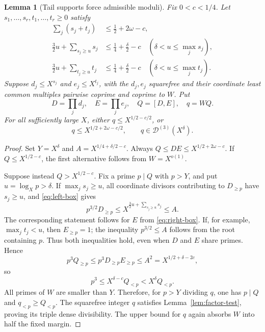 \documentclass[11pt,a4paper]{article}
\newtheorem{lemma}[theorem]{Lemma}
\theoremstyle{definition}\newtheorem{definition}[theorem]{Definition}
\theoremstyle{remark}\newtheorem{remark}[theorem]{Remark}
\numberwithin{equation}{section}
\begin{document}
\begin{lemma}[Tail supports force admissible moduli]\label{lem:lcm}
Fix $0<c<1/4$. Let $s_1,\ldots,s_r,t_1,\ldots,t_r\ge0$ satisfy
\begin{align}
 \sum_j(s_j+t_j)&\le\tfrac12+2\omega-c,\label{eq:total-box}\\
 \tfrac32u+\sum_{s_j\ge u}s_j&\le\tfrac14+\tfrac\delta2-c
 \quad(\delta<u\le\max_j s_j),\label{eq:left-box}\\
 \tfrac32u+\sum_{t_j\ge u}t_j&\le\tfrac14+\tfrac\delta2-c
 \quad(\delta<u\le\max_j t_j).\label{eq:right-box}
\end{align}
Suppose $d_j\le X^{s_j}$ and $e_j\le X^{t_j}$, with the $d_j,e_j$ squarefree and their coordinate least common multiples pairwise coprime and coprime to $W$. Put
\[
 D=\prod_jd_j,\quad E=\prod_je_j,\quad Q=[D,E],\quad q=WQ.
\]
For all sufficiently large $X$, either $q\le X^{1/2-c/2}$, or
\[
 q\le X^{1/2+2\omega-c/2},\qquad q\in\mathcal D^{(3)}(X^\delta).
\]
\end{lemma}
\begin{proof}
Set $Y=X^\delta$ and $A=X^{1/4+\delta/2-c}$. Always
$Q\le DE\le X^{1/2+2\omega-c}$. If $Q\le X^{1/2-c}$, the first alternative follows from $W=X^{o(1)}$.

Suppose instead $Q>X^{1/2-c}$. Fix a prime $p\mid Q$ with $p>Y$, and put $u=\log_Xp>\delta$. If $\max_j s_j\ge u$, all coordinate divisors contributing to $D_{\ge p}$ have $s_j\ge u$, and \eqref{eq:left-box} gives
\[
 p^{3/2}D_{\ge p}\le X^{\frac32u+\sum_{s_j\ge u}s_j}\le A.
\]
The corresponding statement follows for $E$ from \eqref{eq:right-box}. If, for example, $\max_jt_j<u$, then $E_{\ge p}=1$; the inequality $p^{3/2}\le A$ follows from the root containing $p$. Thus both inequalities hold, even when $D$ and $E$ share primes. Hence
\[
 p^3Q_{\ge p}\le p^3D_{\ge p}E_{\ge p}
 \le A^2=X^{1/2+\delta-2c},
\]
so
\begin{equation}\label{eq:density-key}
 p^3\le X^{\delta-c}Q_{<p}<X^\delta Q_{<p}.
\end{equation}
All primes of $W$ are smaller than $Y$. Therefore, for $p>Y$ dividing $q$, one has $p\mid Q$ and $q_{<p}\ge Q_{<p}$. The squarefree integer $q$ satisfies Lemma~\ref{lem:factor-test}, proving its triple dense divisibility. The upper bound for $q$ again absorbs $W$ into half the fixed margin.
\end{proof}
\end{document}
